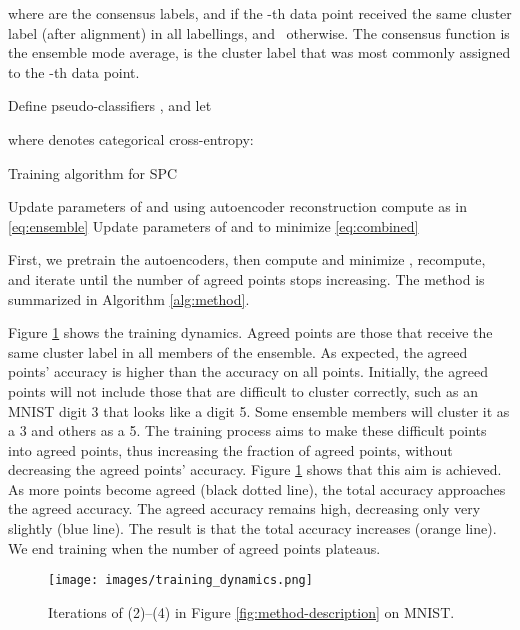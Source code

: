 \documentclass[runningheads]{llncs}
\begin{document}
where  are the consensus labels, and  if the -th data point received the same cluster label (after alignment) in all labellings, and~ otherwise. The consensus function is the ensemble mode average,  is the cluster label that was most commonly assigned to the -th data point. 

Define  pseudo-classifiers \mbox{}, and let 

where  denotes categorical cross-entropy:



\begin{algorithm}[t]
\begin{algorithmic}
\caption {Training algorithm for SPC} \label{alg:method}
\FOR {}
    \STATE Update parameters of  and  using autoencoder reconstruction
\ENDFOR
{}
    \STATE compute  as in \eqref{eq:ensemble}
    \FOR {}
        \STATE Update parameters of  and  to minimize \eqref{eq:combined}
    \ENDFOR
\ENDWHILE
\end{algorithmic}
\end{algorithm}

\noindent First, we pretrain the autoencoders, then compute  and minimize , recompute, and iterate until the number of agreed points stops increasing. The method is summarized in Algorithm \ref{alg:method}.

Figure \ref{fig:training-dynamics} shows the training dynamics. Agreed points are those that receive the same cluster label in all members of the ensemble. As expected, the agreed points' accuracy is higher than the accuracy on all points. Initially, the agreed points will not include those that are difficult to cluster correctly, such as an MNIST digit 3 that looks like a digit 5. Some ensemble members will cluster it as a 3 and others as a 5. The training process aims to make these difficult points into agreed points, thus increasing the fraction of agreed points, without decreasing the agreed points' accuracy. Figure \ref{fig:training-dynamics} shows that this aim is achieved. As more points become agreed (black dotted line), the total accuracy approaches the agreed accuracy. The agreed accuracy remains high, decreasing only very slightly (blue line). The result is that the total accuracy increases (orange line). We end training when the number of agreed points plateaus. 

\begin{figure}[t]
\centering
\texttt{[image: images/training\_dynamics.png]}\vspace*{-1ex}
    \caption{ \footnotesize Iterations of (2)--(4) in Figure \ref{fig:method-description} on MNIST.}
    \label{fig:training-dynamics}\vspace*{-2ex}
\end{figure}
\end{document}
